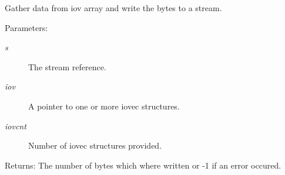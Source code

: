 Gather data from iov array and write the bytes to a stream. 

\begin{Desc}
\item[Parameters:]
\begin{description}
\item[{\em s}]The stream reference. \item[{\em iov}]A pointer to one or more iovec structures. \item[{\em iovcnt}]Number of iovec structures provided.\end{description}
\end{Desc}
\begin{Desc}
\item[Returns:]The number of bytes which where written or -1 if an error occured. \end{Desc}
